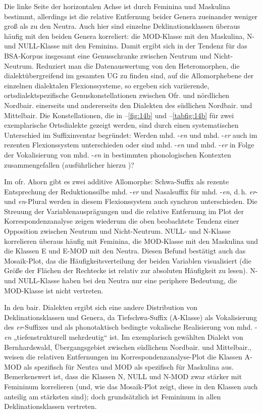 Die linke Seite der horizontalen Achse ist durch Feminina und Maskulina bestimmt, allerdings ist die relative Entfernung beider Genera zueinander weniger groß als zu den Neutra. Auch hier sind einzelne Deklinationsklassen überaus häufig mit den beiden Genera korreliert: die MOD-Klasse mit den Maskulina, N- und NULL-Klasse mit den Feminina. Damit ergibt sich in der Tendenz für das BSA-Korpus insgesamt eine Genusschranke zwischen Neutrum und Nicht-Neutrum. Reduziert man die Datenauswertung von den Heteromorphen, die dialektübergreifend im gesamten UG zu finden sind, auf die Allomorphebene der einzelnen dialektalen Flexionssysteme, so ergeben sich variierende, ortsdialektspezifische Genuskonstellationen zwischen Ofr. und nördlichen Nordbair. einerseits und andererseits den Dialekten des südlichen Nordbair. und Mittelbair. Die Konstellationen, die in  --\ref{fig:14b} und --\ref{tabfig:14b} für zwei exemplarische Ortsdialekte gezeigt werden, sind durch einen systematischen Unterschied im Suffixinventar begründet: Werden mhd. -\textit{en} und mhd. -\textit{er} auch im rezenten Flexionssystem unterschieden oder sind mhd. -\textit{en} und mhd. -\textit{er} in Folge der Vokalisierung von mhd. -\textit{en} in bestimmten phonologischen Kontexten zusammengefallen (ausführlicher hierzu )?

Im ofr. Ahorn gibt es zwei additive Allomorphe: Schwa-Suffix als rezente Entsprechung der Reduktionssilbe mhd. -\textit{er} und Nasalsuffix für mhd. -\textit{en}, d.\,h. \textit{er}{}- und \textit{en}{}-Plural werden in diesem Flexionssystem auch synchron unterschieden. Die Streuung der Variablenausprägungen und die relative Entfernung im Plot der Korrespondenzanalyse zeigen wiederum die oben beobachtete Tendenz einer Opposition zwischen Neutrum und Nicht-Neutrum. NULL- und N-Klasse korrelieren überaus häufig mit Feminina, die MOD-Klasse mit den Maskulina und die Klassen E und E-MOD mit den Neutra. Diesen Befund bestätigt auch das Mosaik-Plot, das die Häufigkeitsverteilung der beiden Variablen visualisiert (die Größe der Flächen der Rechtecke ist relativ zur absoluten Häufigkeit zu lesen). N- und NULL-Klasse haben bei den Neutra nur eine periphere Bedeutung, die MOD-Klasse ist nicht vertreten.

In den bair. Dialekten ergibt sich eine andere Distribution von Deklinationsklassen und Genera, da Tiefschwa-Suffix (A-Klasse) als Vokalisierung des \textit{er}{}-Suffixes und als phonotaktisch bedingte vokalische Realisierung von mhd. -\textit{en} „tiefenstrukturell mehrdeutig“ \citep[127]{Rowley1997} ist. Im exemplarisch gewählten Dialekt von Bernhardswald, Übergangsgebiet zwischen südlichem Nordbair. und Mittelbair., weisen die relativen Entfernungen im Korrespondenzanalyse-Plot die
Klassen A-MOD als spezifisch für Neutra und MOD als spezifisch für Maskulina aus. Bemerkenswert ist, dass die Klassen N, NULL und N-MOD zwar stärker mit Femininum korrelieren (und, wie das Mosaik-Plot zeigt, diese in den Klassen auch anteilig am stärksten sind); doch grundsätzlich ist Femininum in allen Deklinationsklassen vertreten.

